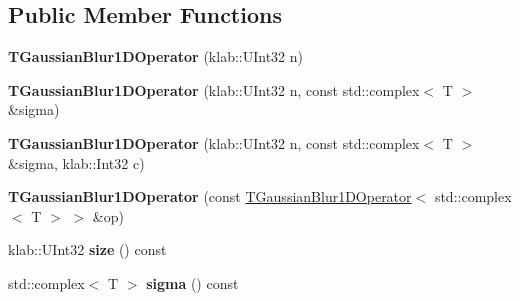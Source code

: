 \subsection*{Public Member Functions}
\begin{DoxyCompactItemize}
\item 
{\bfseries T\+Gaussian\+Blur1\+D\+Operator} (klab\+::\+U\+Int32 n)\hypertarget{classkl1p_1_1TGaussianBlur1DOperator_3_01std_1_1complex_3_01T_01_4_01_4_a6ef3d0d3ff105466a7a38582810bec13}{}\label{classkl1p_1_1TGaussianBlur1DOperator_3_01std_1_1complex_3_01T_01_4_01_4_a6ef3d0d3ff105466a7a38582810bec13}

\item 
{\bfseries T\+Gaussian\+Blur1\+D\+Operator} (klab\+::\+U\+Int32 n, const std\+::complex$<$ T $>$ \&sigma)\hypertarget{classkl1p_1_1TGaussianBlur1DOperator_3_01std_1_1complex_3_01T_01_4_01_4_a76879772e51d6575c677f050ea32e076}{}\label{classkl1p_1_1TGaussianBlur1DOperator_3_01std_1_1complex_3_01T_01_4_01_4_a76879772e51d6575c677f050ea32e076}

\item 
{\bfseries T\+Gaussian\+Blur1\+D\+Operator} (klab\+::\+U\+Int32 n, const std\+::complex$<$ T $>$ \&sigma, klab\+::\+Int32 c)\hypertarget{classkl1p_1_1TGaussianBlur1DOperator_3_01std_1_1complex_3_01T_01_4_01_4_ac84daca7243fd87bf6a00211b19fbb38}{}\label{classkl1p_1_1TGaussianBlur1DOperator_3_01std_1_1complex_3_01T_01_4_01_4_ac84daca7243fd87bf6a00211b19fbb38}

\item 
{\bfseries T\+Gaussian\+Blur1\+D\+Operator} (const \hyperlink{classkl1p_1_1TGaussianBlur1DOperator}{T\+Gaussian\+Blur1\+D\+Operator}$<$ std\+::complex$<$ T $>$ $>$ \&op)\hypertarget{classkl1p_1_1TGaussianBlur1DOperator_3_01std_1_1complex_3_01T_01_4_01_4_ad5d3d346f0b1c01daadf238dfa5ba5c5}{}\label{classkl1p_1_1TGaussianBlur1DOperator_3_01std_1_1complex_3_01T_01_4_01_4_ad5d3d346f0b1c01daadf238dfa5ba5c5}

\item 
klab\+::\+U\+Int32 {\bfseries size} () const \hypertarget{classkl1p_1_1TGaussianBlur1DOperator_3_01std_1_1complex_3_01T_01_4_01_4_a6ad95a5d2c231039c2681249ff7d3806}{}\label{classkl1p_1_1TGaussianBlur1DOperator_3_01std_1_1complex_3_01T_01_4_01_4_a6ad95a5d2c231039c2681249ff7d3806}

\item 
std\+::complex$<$ T $>$ {\bfseries sigma} () const \hypertarget{classkl1p_1_1TGaussianBlur1DOperator_3_01std_1_1complex_3_01T_01_4_01_4_a14659e1611e0ea131fc595790e8a48b3}{}\label{classkl1p_1_1TGaussianBlur1DOperator_3_01std_1_1complex_3_01T_01_4_01_4_a14659e1611e0ea131fc595790e8a48b3}


\end{DoxyCompactItemize}

